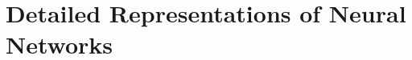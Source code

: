\documentclass[11pt,a4paper,openright,twoside]{report}
\theoremstyle{plain}
\theoremstyle{definition}
\begin{document}
\clearpage{\pagestyle{empty}\cleardoublepage}




























































































\chapter{Detailed Representations of Neural Networks}
\lhead[\fancyplain{}{\bfseries\thepage}]{\fancyplain{}{\bfseries\rightmark}}
\end{document}
